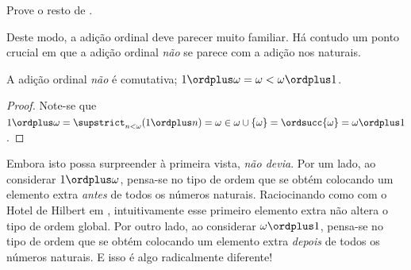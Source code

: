 \documentclass[../../../include/open-logic-section]{subfiles}
\begin{document}
\begin{prob}
Prove o resto de
.
\end{prob}

Deste modo, a adição ordinal deve parecer muito familiar. Há contudo um ponto crucial em que a adição ordinal \emph{não} se parece com a adição nos naturais.

\begin{prop}
A adição ordinal \emph{não} é comutativa; $1 \ordplus  \omega = \omega <
\omega \ordplus  1$.
\end{prop}

\begin{proof}
Note-se que $1 \ordplus  \omega = \supstrict_{n < \omega} (1 \ordplus n)
= \omega \in \omega \cup \{\omega\} = \ordsucc{\omega} = \omega
\ordplus  1$.
\end{proof}
\noindent
Embora isto possa surpreender à primeira vista, \emph{não devia}. Por
um lado, ao considerar $1 \ordplus  \omega$, pensa-se no
tipo de ordem que se obtém colocando um elemento extra \emph{antes} de
todos os números naturais. Raciocinando como com o Hotel de Hilbert em
, intuitivamente esse primeiro elemento
extra não altera o tipo de ordem global. Por
outro lado, ao considerar $\omega \ordplus  1$, pensa-se no
tipo de ordem que se obtém colocando um elemento extra \emph{depois} de
todos os números naturais. E isso é algo radicalmente diferente!
\end{document}
